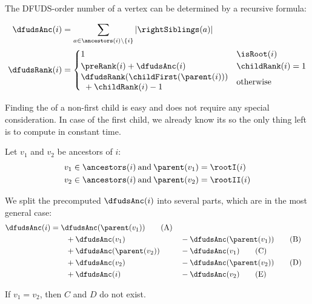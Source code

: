 \begin{lemma}
	The DFUDS-order number of a vertex can be determined by a recursive formula:

	\begin{align*}
		\dfudsAnc(i) &= \sum_{a \in \ancestors(i) \setminus \{i\}} |\rightSiblings(a)| \\
		\dfudsRank(i) &=
		\begin{cases}
			1 & \isRoot(i) \\
			\preRank(i) + \dfudsAnc(i)  & \childRank(i) = 1 \\
			\!\begin{aligned}
				&\dfudsRank(\childFirst(\parent(i))) \\
				&\ + \childRank(i) - 1
			\end{aligned} & \textotherwise
		\end{cases}
	\end{align*}
\end{lemma}

Finding the \dfudsRank{} of a non-first child is easy and does not require any special consideration.
In case of the first child, we already know its \preRank{} so the only thing left is to compute \dfudsAnc{} in constant time.

Let $v_1$ and $v_2$ be ancestors of $i$:
\begin{align*}
	v_1 \in \ancestors(i) &\booland \parent(v_1) = \rootI(i) \\
	v_2 \in \ancestors(i) &\booland \parent(v_2) = \rootII(i)
\end{align*}

We split the precomputed $\dfudsAnc(i)$ into several parts, which are in the most general case:
\begin{alignat}{2}
	\dfudsAnc(i) &= \dfudsAnc(\parent(v_1)) \tag{A}\\
	&\qquad + \dfudsAnc(v_1) &&- \dfudsAnc(\parent(v_1)) \tag{B}\\
	&\qquad + \dfudsAnc(\parent(v_2)) &&- \dfudsAnc(v_1) \tag{C}\\
	&\qquad + \dfudsAnc(v_2) &&- \dfudsAnc(\parent(v_2)) \tag{D}\\
	&\qquad + \dfudsAnc(i) &&- \dfudsAnc(v_2) \tag{E}
\end{alignat}

If $v_1 = v_2$, then $C$ and $D$ do not exist.

